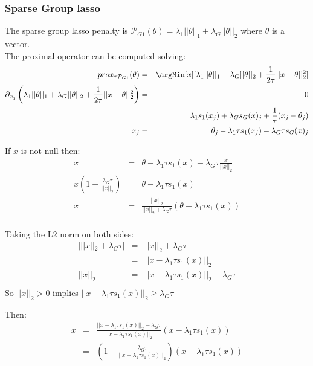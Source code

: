 \documentclass{article}
\begin{document}
\boxResult{
\[prox_{\tau \mathcal{P}_1}(\theta) = prox_{\tau \mathcal{P}_2}(prox_{\tau \mathcal{P}_1}(\theta)) \]
}
\subsubsection{Sparse Group lasso}
\label{sec:orgb73b055}
The sparse group lasso penalty is $\mathcal{P}_{G1}(\theta)=\lambda_1||\theta||_1 + \lambda_G||\theta||_2$ where $\theta$ is a vector. \\
		
The proximal operator can be computed solving:
\begin{eqnarray*}
prox_{\tau \mathcal{P}_{G1}}(\theta) &=& \argMin[x][\lambda_1||\theta||_1 + \lambda_G||\theta||_2+\frac{1}{2\tau} ||x-\theta||_2^2] \\
\partial_{x_j}\left(\lambda_1||\theta||_1 + \lambda_G||\theta||_2+\frac{1}{2 \tau} ||x-\theta||_2^2 \right) 
       &=& 0 \\
       &=& \lambda_1 s_1(x_j)+\lambda_G s_G(x)_j+\frac{1}{\tau} (x_j-\theta_j) \\
     x_j &=& \theta_j - \lambda_1 \tau s_1(x_j) - \lambda_G \tau s_G(x)_j \\		
\end{eqnarray*}

If  \(x\) is not null then:
\begin{eqnarray*}
     x &=& \theta - \lambda_1 \tau s_1(x) - \lambda_G \tau \frac{x}{||x||_2} \\		
     x \left(1 +  \frac{\lambda_G \tau}{||x||_2}\right) &=& \theta - \lambda_1 \tau s_1(x) \\		
     x  &=& \frac{||x||_2}{||x||_2 + \lambda_G \tau} \left(\theta - \lambda_1 \tau s_1(x) \right)\\		
\end{eqnarray*}

Taking the L2 norm on both sides:
\begin{eqnarray*}
    | ||x||_2 + \lambda_G \tau | &=&  ||x||_2 + \lambda_G \tau   \\
     &=& ||x - \lambda_1 \tau s_1(x)||_2 \\		
     ||x||_2 &=& ||x - \lambda_1 \tau s_1(x)||_2 - \lambda_G \tau \\		
\end{eqnarray*}
So \(||x||_2>0\) implies \(||x - \lambda_1 \tau s_1(x)||_2 \geq \lambda_G \tau\)

Then:		
\begin{eqnarray*}
     x  &=&\frac{||x - \lambda_1 \tau s_1(x)||_2 - \lambda_G \tau}{||x - \lambda_1 \tau s_1(x)||_2} \left( x - \lambda_1 \tau s_1(x) \right)\\		
       &=& \left(1-\frac{\lambda_G \tau}{||x - \lambda_1 \tau s_1(x)||_2}\right) \left( x - \lambda_1 \tau s_1(x) \right)\\		
\end{eqnarray*}
\end{document}
